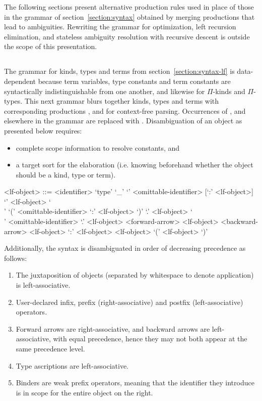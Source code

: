 The following sections present alternative production rules used in place of those in the grammar of section~\ref{section:syntax} obtained by merging productions that lead to ambiguities.
Rewriting the grammar for optimization, left recursion elimination, and stateless ambiguity resolution with recursive descent is outside the scope of this presentation.

\subsection{\LF}

The grammar for \LF kinds, types and terms from section~\ref{section:syntax-lf} is data-dependent because \LF term variables, type constants and term constants are syntactically indistinguishable from one another, and likewise for $ \Pi $-kinds and $ \Pi $-types.
This next grammar blurs together \LF kinds, types and terms with corresponding productions ,  and  for context-free parsing.
Occurrences of ,  and  elsewhere in the grammar are replaced with .
Disambiguation of an \LF object as presented below requires:
\begin{itemize}
\item complete scope information to resolve constants, and
\item a target sort for the elaboration (i.e. knowing beforehand whether the \LF object should be a kind, type or term).
\end{itemize}

\begin{grammar}
<lf-object> ::= <identifier>
\alt `type'
\alt `_'
\alt `{' <omittable-identifier> [`:' <lf-object>] `}' <lf-object>
\alt `\\' `(' <omittable-identifier> `:' <lf-object> `)' `.' <lf-object>
\alt `\\' <omittable-identifier> `.' <lf-object>
 <forward-arrow> <lf-object>
 <backward-arrow> <lf-object>
 `:' <lf-object>
 <lf-object>
\alt `(' <lf-object> `)'
\end{grammar}

Additionally, the syntax is disambiguated in order of decreasing precedence as follows:

\begin{enumerate}
\item The juxtaposition of \LF objects (separated by whitespace to denote application) is left-associative.
\item User-declared infix, prefix (right-associative) and postfix (left-associative) operators.
\item Forward arrows are right-associative, and backward arrows are left-associative, with equal precedence, hence they may not both appear at the same precedence level.
\item Type ascriptions are left-associative.
\item Binders are weak prefix operators, meaning that the identifier they introduce is in scope for the entire \LF object on the right.
\end{enumerate}


